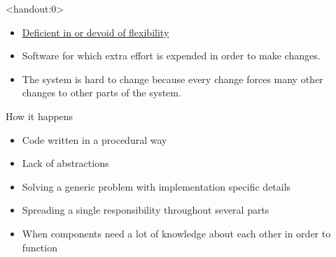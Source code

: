 \documentclass[xcolor=svgnames, handout]{beamer}
\begin{document}

{%
%
\begin{frame}<handout:0>{\subsecname}
\end{frame}
}

{%
%
\begin{frame}{\subsecname}

    \begin{itemize}
        \item \href{https://www.merriam-webster.com/dictionary/rigid}
            {Deficient in or devoid of flexibility} \pause
        \item Software for which extra effort is expended in order to make
            changes. \pause
        \item The system is hard to change because every change forces many
            other changes to other parts of the system.
    \end{itemize}
\end{frame}
}


{%
%
\begin{frame}{\subsecname}

    How it happens
    \begin{itemize}
        \pause \item Code written in a procedural way
        \pause \item Lack of abstractions
        \pause \item Solving a generic problem with implementation specific details
        \pause \item Spreading a single responsibility throughout several parts
        \pause \item When components need a lot of knowledge about each other in
            order to function
    \end{itemize}
\end{frame}
}
\end{document}
